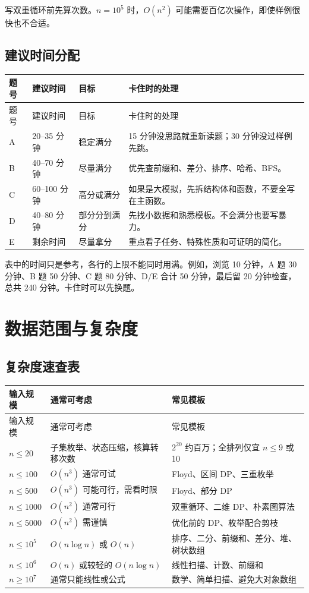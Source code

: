 写双重循环前先算次数。$n=10^5$ 时，$O(n^2)$ 可能需要百亿次操作，即使样例很快也不合适。

\subsection{建议时间分配}

\begin{longtable}{p{2cm}p{3cm}p{5cm}p{4cm}}
\toprule
题号 & 建议时间 & 目标 & 卡住时的处理 \\
\midrule
\endfirsthead
\toprule
题号 & 建议时间 & 目标 & 卡住时的处理 \\
\midrule
\endhead
A & 20--35 分钟 & 稳定满分 & 15 分钟没思路就重新读题；30 分钟没过样例先跳。 \\
B & 40--70 分钟 & 尽量满分 & 优先查前缀和、差分、排序、哈希、BFS。 \\
C & 60--100 分钟 & 高分或满分 & 如果是大模拟，先拆结构体和函数，不要全写在主函数。 \\
D & 40--80 分钟 & 部分分到满分 & 先找小数据和熟悉模板。不会满分也要写暴力。 \\
E & 剩余时间 & 尽量拿分 & 重点看子任务、特殊性质和可证明的简化。 \\
\bottomrule
\end{longtable}

表中的时间只是参考，各行的上限不能同时用满。例如，浏览 10 分钟，A 题 30 分钟、B 题 50 分钟、C 题 80 分钟、D/E 合计 50 分钟，最后留 20 分钟检查，总共 240 分钟。卡住时可以先换题。

\section{数据范围与复杂度}\label{sec:01-5}

\subsection{复杂度速查表}

\begin{longtable}{p{4cm}p{5cm}p{5cm}}
\toprule
输入规模 & 通常可考虑 & 常见模板 \\
\midrule
\endfirsthead
\toprule
输入规模 & 通常可考虑 & 常见模板 \\
\midrule
\endhead
$n \le 20$ & 子集枚举、状态压缩，核算转移次数 & $2^{20}$ 约百万；全排列仅宜 $n\le 9$ 或 10 \\
$n \le 100$ & $O(n^3)$ 通常可试 & Floyd、区间 DP、三重枚举 \\
$n \le 500$ & $O(n^3)$ 可能可行，需看时限 & Floyd、部分 DP \\
$n \le 1000$ & $O(n^2)$ 通常可行 & 双重循环、二维 DP、朴素图算法 \\
$n \le 5000$ & $O(n^2)$ 需谨慎 & 优化前的 DP、枚举配合剪枝 \\
$n \le 10^5$ & $O(n \log n)$ 或 $O(n)$ & 排序、二分、前缀和、差分、堆、树状数组 \\
$n \le 10^6$ & $O(n)$ 或较轻的 $O(n \log n)$ & 线性扫描、计数、前缀和 \\
$n \ge 10^7$ & 通常只能线性或公式 & 数学、简单扫描、避免大对象数组 \\
\bottomrule
\end{longtable}


